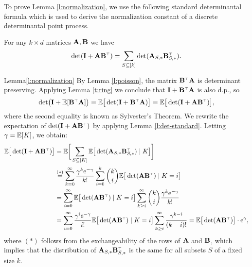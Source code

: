 To prove Lemma \ref{l:normalization}, we use the following standard
determinantal formula which is used to derive the normalization
constant of a discrete determinantal point process.
\begin{lemma}\label{l:det-standard}
  For any $k\times d$ matrices $\mathbf A,\mathbf B$ we have
  \[\det(\I+\A\B^\top)=\sum_{S\subseteq[k]}\det(\A_{S,*}\B_{S,*}^\top).\]
\end{lemma}

\begin{proofof}{Lemma}{\ref{l:normalization}}
By Lemma \ref{l:poisson}, the matrix $\B^\top\A$ is determinant
preserving. Applying Lemma \ref{t:ring} we conclude that
$\I+\B^\top\A$ is also d.p., so
\begin{align*}
  \det\!\big(\I+\E[\B^\top\A]\big) = \E\big[\det(\I+\B^\top\A)\big] =\E\big[\det(\I+\A\B^\top)\big],
\end{align*}
where the second equality is known as Sylvester's Theorem.
We rewrite the expectation of $\det(\I+\A\B^\top)$ by applying Lemma
\ref{l:det-standard}.  Letting $\gamma=\mathbb E[K]$, we obtain:
\begin{align*}
\E\big[\det(\I+\A\B^\top)\big]  &=\E\bigg[\sum_{S\subseteq [K]}\E\big[\det(\A_{S,*}\B_{S,*}^\top)\mid
    K\big]\bigg]\\
  &\overset{(*)}{=}\sum_{k=0}^\infty\frac{\gamma^k\ee^{-\gamma}}{k!}
  \sum_{i=0}^k\binom{k}{i} \E\big[\det(\A\B^\top)\mid K=i\big]\\
  &=\sum_{i=0}^\infty \E\big[\det(\A\B^\top)\mid K=i\big]
  \sum_{k\geq i}^\infty \binom{k}{i}
  \frac{\gamma^k\ee^{-\gamma}}{k!}\\
  &=\sum_{i=0}^\infty
    \frac{\gamma^i\ee^{-\gamma}}{i!}\E\big[\det(\A\B^\top)\mid K=i\big]
    \sum_{k\geq i}^\infty\frac{\gamma^{k-i}}{(k-i)!} = \E\big[\det(\A\B^\top)\big]\cdot\ee^\gamma,
\end{align*}
where $(*)$ follows from the exchangeability of the rows of $\mathbf A$ and
$\mathbf B$, which implies that the distribution of $\A_{S,*}\B_{S,*}^\top$ is the
same for all subsets $S$ of a fixed size $k$.
\end{proofof}

